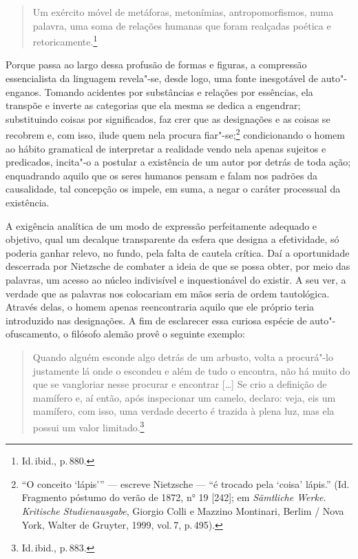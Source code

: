 \begin{quote}
Um exército
móvel de metáforas, metonímias, antropomorfismos, numa palavra, uma
soma de relações humanas que foram realçadas poética e
retoricamente.\footnote{ Id.\,ibid., p.\,880.}
\end{quote}

Porque passa ao largo dessa profusão de formas e figuras, a compressão
essencialista da linguagem revela"-se, desde logo, uma fonte
inesgotável de auto"-enganos. Tomando acidentes por substâncias e
relações por essências, ela transpõe e inverte as categorias que ela mesma
se dedica a engendrar; substituindo coisas por significados, faz crer
que as designações e as coisas se recobrem e, com isso, ilude quem nela
procura fiar"-se;\footnote{ “O conceito ‘lápis’” --- escreve Nietzsche ---
“é trocado pela ‘coisa’ lápis.” (Id.\,Fragmento póstumo do verão de
1872, n° 19 [242]; em \textit{Sämtliche Werke. Kritische
Studienausgabe}, Giorgio Colli e Mazzino Montinari, Berlim / Nova
York, Walter de Gruyter, 1999, vol.\,7, p.\,495).} condicionando o homem
ao hábito gramatical de interpretar a realidade vendo nela apenas
sujeitos e predicados, incita"-o a postular a existência de um autor
por detrás de toda ação; enquadrando aquilo que os seres humanos pensam
e falam nos padrões da causalidade, tal concepção os impele, em
suma, a negar o caráter processual da existência.

A exigência analítica de um modo de expressão perfeitamente
adequado e objetivo, qual um decalque transparente da esfera que
designa a efetividade, só poderia ganhar relevo, no fundo, pela falta de
cautela crítica. Daí a oportunidade descerrada por Nietzsche de
combater a ideia de que se possa obter, por meio das palavras, um
acesso ao núcleo indivisível e inquestionável do existir. 
A seu ver, a verdade que as
palavras nos colocariam em mãos seria de ordem tautológica. Através
delas, o homem apenas reencontraria aquilo que ele próprio teria
introduzido nas designações. A fim de esclarecer essa curiosa espécie
de auto"-ofuscamento, o filósofo alemão provê o seguinte exemplo:

\begin{quote}
Quando alguém esconde algo detrás de um arbusto, volta a
procurá"-lo justamente lá onde o escondeu e além de tudo o encontra,
não há muito do que se vangloriar nesse procurar e encontrar [\ldots{}] Se
crio a definição de mamífero e, aí então, após inspecionar um camelo,
declaro: veja, eis um mamífero, com isso, uma verdade decerto é trazida
à plena luz, mas ela possui um valor limitado.\footnote{ Id.\,ibid., p.\,883.}
\end{quote}

